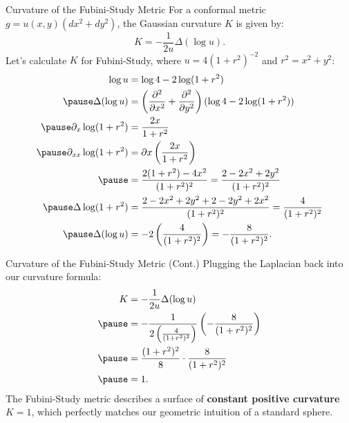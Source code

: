 \documentclass[aspectratio=1610,10pt]{beamer}
\begin{document}
  \begin{frame}{Curvature of the Fubini-Study Metric}
    For a conformal metric $g = u(x,y)(dx^2 + dy^2)$, the Gaussian curvature $K$ is given by:
    \[%
      K = -\frac{1}{2u}\Delta (\log u)
    .\]%
    Let's calculate $K$ for Fubini-Study, where $u = 4(1+r^2)^{-2}$ and $r^2 = x^2+y^2$:
    \begin{align*}
      \log u &= \log 4 - 2\log(1+r^2) \\ \pause
      \Delta (\log u) &= \left(\frac{\partial^2}{\partial x^2} + \frac{\partial^2}{\partial y^2}\right) (\log 4 - 2\log(1+r^2)) \\ \pause
      \partial_x \log(1+r^2) &= \frac{2x}{1+r^2} \\ \pause
      \partial_{xx} \log(1+r^2) &= \partial{x} \left(\frac{2x}{1+r^2}\right) \\ \pause
                               &= \frac{2(1+r^2) - 4x^2}{(1+r^2)^2} = \frac{2-2x^2+2y^2}{(1+r^2)^2} \\ \pause
      \Delta \log(1+r^2) &= \frac{2-2x^2+2y^2 + 2-2y^2+2x^2}{(1+r^2)^2} = \frac{4}{(1+r^2)^2} \\ \pause
      \Delta (\log u) &= -2 \left( \frac{4}{(1+r^2)^2} \right) = -\frac{8}{(1+r^2)^2}
    .\end{align*}
  \end{frame}

  \begin{frame}{Curvature of the Fubini-Study Metric (Cont.)}
    Plugging the Laplacian back into our curvature formula:
    \begin{align*}
      K &= -\frac{1}{2u}\Delta (\log u) \\ \pause
        &= -\frac{1}{2 \left( \frac{4}{(1+r^2)^2} \right)} \left( -\frac{8}{(1+r^2)^2} \right) \\ \pause
        &= \frac{(1+r^2)^2}{8} \cdot \frac{8}{(1+r^2)^2} \\ \pause
        &= 1
    .\end{align*}
    The Fubini-Study metric describes a surface of \textbf{constant positive curvature} $K=1$, which perfectly matches our geometric intuition of a standard sphere.
  \end{frame}
\end{document}
